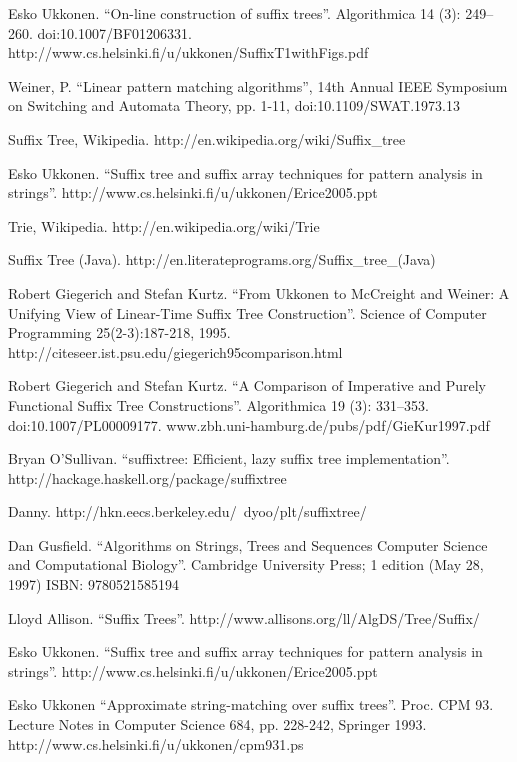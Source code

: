 \documentclass[UTF8]{article}
\begin{document}
\ifx\wholebook\relax \else
\begin{thebibliography}{99}

Esko Ukkonen. ``On-line construction of suffix trees''. Algorithmica 14 (3): 249--260. doi:10.1007/BF01206331. http://www.cs.helsinki.fi/u/ukkonen/SuffixT1withFigs.pdf

Weiner, P. ``Linear pattern matching algorithms'', 14th Annual IEEE Symposium on Switching and Automata Theory, pp. 1-11, doi:10.1109/SWAT.1973.13

Suffix Tree, Wikipedia. http://en.wikipedia.org/wiki/Suffix\_tree

Esko Ukkonen. ``Suffix tree and suffix array techniques for pattern analysis in strings''. http://www.cs.helsinki.fi/u/ukkonen/Erice2005.ppt

Trie, Wikipedia. http://en.wikipedia.org/wiki/Trie

Suffix Tree (Java). http://en.literateprograms.org/Suffix\_tree\_(Java)

Robert Giegerich and Stefan Kurtz. ``From Ukkonen to McCreight and Weiner: A Unifying View of Linear-Time Suffix Tree Construction''. Science of Computer Programming 25(2-3):187-218, 1995. http://citeseer.ist.psu.edu/giegerich95comparison.html

Robert Giegerich and Stefan Kurtz. ``A Comparison of Imperative and Purely Functional Suffix Tree Constructions''. Algorithmica 19 (3): 331--353. doi:10.1007/PL00009177. www.zbh.uni-hamburg.de/pubs/pdf/GieKur1997.pdf

Bryan O'Sullivan. ``suffixtree: Efficient, lazy suffix tree implementation''. http://hackage.haskell.org/package/suffixtree

Danny. http://hkn.eecs.berkeley.edu/~dyoo/plt/suffixtree/

Dan Gusfield. ``Algorithms on Strings, Trees and Sequences Computer Science and Computational Biology''. Cambridge University Press; 1 edition (May 28, 1997) ISBN: 9780521585194

Lloyd Allison. ``Suffix Trees''. http://www.allisons.org/ll/AlgDS/Tree/Suffix/

Esko Ukkonen. ``Suffix tree and suffix array techniques for pattern analysis in strings''. http://www.cs.helsinki.fi/u/ukkonen/Erice2005.ppt

Esko Ukkonen ``Approximate string-matching over suffix trees''. Proc. CPM 93. Lecture Notes in Computer Science 684, pp. 228-242, Springer 1993. http://www.cs.helsinki.fi/u/ukkonen/cpm931.ps

\end{thebibliography}
\end{document}
